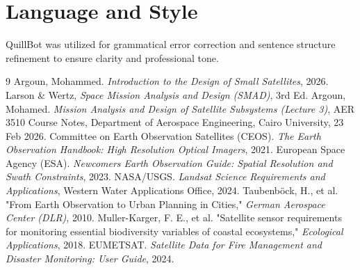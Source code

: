 ﻿\documentclass[12pt,a4paper]{report}
\begin{document}
\section*{Language and Style}
 QuillBot was utilized for grammatical error correction and sentence structure refinement to ensure clarity and professional tone.

\begin{thebibliography}{9}
     Argoun, Mohammed. \textit{Introduction to the Design of Small Satellites}, 2026.
     Larson \& Wertz, \textit{Space Mission Analysis and Design (SMAD)}, 3rd Ed.
     Argoun, Mohamed. \textit{Mission Analysis and Design of Satellite Subsystems (Lecture 3)}, AER 3510 Course Notes, Department of Aerospace Engineering, Cairo University, 23 Feb 2026.
     Committee on Earth Observation Satellites (CEOS). \textit{The Earth Observation Handbook: High Resolution Optical Imagers}, 2021.
 European Space Agency (ESA). \textit{Newcomers Earth Observation Guide: Spatial Resolution and Swath Constraints}, 2023.
 NASA/USGS. \textit{Landsat Science Requirements and Applications}, Western Water Applications Office, 2024.
 Taubenböck, H., et al. "From Earth Observation to Urban Planning in Cities," \textit{German Aerospace Center (DLR)}, 2010.
 Muller-Karger, F. E., et al. "Satellite sensor requirements for monitoring essential biodiversity variables of coastal ecosystems," \textit{Ecological Applications}, 2018.
 EUMETSAT. \textit{Satellite Data for Fire Management and Disaster Monitoring: User Guide}, 2024.
    
\end{thebibliography}
\end{document}
